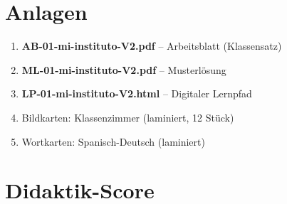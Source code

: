 \documentclass[11pt,a4paper]{article}
\begin{document}
\section{Anlagen}

\begin{enumerate}
    \item \textbf{AB-01-mi-instituto-V2.pdf} -- Arbeitsblatt (Klassensatz)
    \item \textbf{ML-01-mi-instituto-V2.pdf} -- Musterlösung
    \item \textbf{LP-01-mi-instituto-V2.html} -- Digitaler Lernpfad
    \item Bildkarten: Klassenzimmer (laminiert, 12 Stück)
    \item Wortkarten: Spanisch-Deutsch (laminiert)
\end{enumerate}

\newpage
\section{Didaktik-Score}
\end{document}
